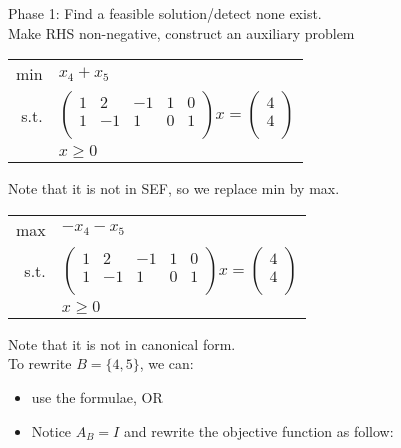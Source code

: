\documentclass[letterpaper, 12pt]{article}
\begin{document}
    Phase 1: Find a feasible solution/detect none exist.\\
    Make RHS non-negative, construct an auxiliary problem\\
    \begin{center}
        \begin{tabular}{rl}
            min & $x_4 + x_5$\\
            s.t. & $\begin{pmatrix}
                1 & 2 & -1 & 1 & 0\\
                1 & -1 & 1 & 0 & 1\\
            \end{pmatrix}x = \begin{pmatrix}
                4\\4\\
            \end{pmatrix}$\\
            & $x \geq 0$\\
        \end{tabular}
    \end{center}
    Note that it is not in SEF, so we replace min by max.\\
    \begin{center}
        \begin{tabular}{rl}
            max & $-x_4 - x_5$\\
            s.t. & $\begin{pmatrix}
                1 & 2 & -1 & 1 & 0\\
                1 & -1 & 1 & 0 & 1\\
            \end{pmatrix}x = \begin{pmatrix}
                4\\4\\
            \end{pmatrix}$\\
            & $x \geq 0$\\
        \end{tabular}
    \end{center}
    Note that it is not in canonical form.\\
    To rewrite $B = \{4,5\}$, we can:
    \begin{itemize}
        \item use the formulae, OR
        \item Notice $A_B = I$ and rewrite the objective function as follow:\\
    \end{itemize}
\end{document}
